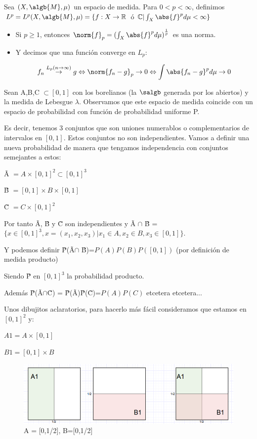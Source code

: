 \documentclass{apuntes}
\begin{document}
\begin{defn}
Sea $(X, \algb{M}, \mu)$ un espacio de medida. Para $0<p<\infty$, definimos $L^p=L^p(X,\algb{M},\mu)=\{f:X\rightarrow \mathbb{R}$ ó $\mathbb{C} | \int_X \abs{f}^p d\mu < \infty\}$

\begin{itemize}
\item Si $p \geq 1$, entonces $\norm{f}_p = (\int_X {\abs{f}^p d\mu)}^{\frac{1}{p}}$ es una norma.
\item Y decimos que una función converge en $L_p$:

\[
f_n \stackrel{L_p (n\rightarrow \infty)}{\rightarrow} g \Leftrightarrow \norm{f_n -g}_p  \rightarrow 0 \Leftrightarrow \int{\abs{f_n -g}^pd\mu} \rightarrow 0
\]
\end{itemize}
\end{defn}

\begin{example}
Sean A,B,C $\subset [0,1]$ con los borelianos (la $\salgb$ generada por los abiertos) y la medida de Lebesgue $\lambda$. Observamos que este espacio de medida coincide con un espacio de probabilidad con función de probabilidad uniforme P.

Es decir, tenemos 3 conjuntos que son uniones numerablos o complementarios de intervalos en $[0,1]$. Estos conjuntos no son independientes. Vamos a definir una nueva probabilidad de manera que tengamos independencia con conjuntos semejantes a estos:

\~{A} $= A\times[0,1]^2 \subset [0,1]^3$

\~{B} $= [0,1]\times B \times[0,1]$

\~{C} $= C \times[0,1]^2$

Por tanto \~{A}, \~{B} y \~{C} son independientes y \~{A} $\cap$ \~{B} = $\{x \in [0,1]^3, x=(x_1, x_2, x_3) | x_1 \in A, x_2 \in B, x_3 \in [0,1]\}$.

Y podemos definir \~{P}(\~{A}$\cap$ \~{B})=$P(A)P(B)P([0,1])$ (por definición de medida producto)

Siendo \~{P} en $[0,1]^3$ la probabilidad producto.

Además \~{P}(\~{A}$\cap$\~{C}) = \~{P}(\~{A})\~{P}(\~{C})=$P(A)P(C)$ etcetera etcetera...

Unos dibujitos aclaratorios, para hacerlo más fácil consideramos que estamos en $[0,1]^2$ y:

$A1 = A\times[0,1]$

$B1 = [0,1]\times B$

\begin{figure}[h]
\centering
\includegraphics[page=1,scale=0.545]{img/Dvenn3.png}
\caption{A = [0,1/2], B=[0,1/2]}
\end{figure}

\end{example}
\end{document}
